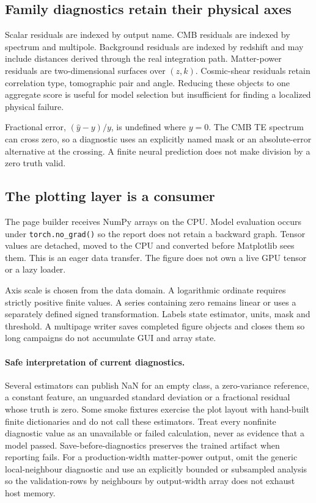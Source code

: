 \documentclass[10pt,aps,prd,twocolumn,nofootinbib]{revtex4-2}
\newcommand{\code}[1]{\texttt{#1}}
\begin{document}
\subsection{Family diagnostics retain their physical axes}

Scalar residuals are indexed by output name.  CMB residuals are indexed by
spectrum and multipole.  Background residuals are indexed by redshift and may
include distances derived through the real integration path.  Matter-power
residuals are two-dimensional surfaces over \((z,k)\).  Cosmic-shear residuals
retain correlation type, tomographic pair and angle.  Reducing these objects
to one aggregate score is useful for model selection but insufficient for
finding a localized physical failure.

Fractional error, \((\widehat y-y)/y\), is undefined where \(y=0\).  The CMB
TE spectrum can cross zero, so a diagnostic uses an explicitly named mask or
an absolute-error alternative at the crossing.  A finite neural prediction
does not make division by a zero truth valid.

\subsection{The plotting layer is a consumer}

The page builder receives NumPy arrays on the CPU.  Model evaluation occurs
under \code{torch.no\_grad()} so the report does not retain a backward graph.
Tensor values are detached, moved to the CPU and converted before Matplotlib
sees them.  This is an eager data transfer.  The figure does not own a live GPU
tensor or a lazy loader.

Axis scale is chosen from the data domain.  A logarithmic ordinate requires
strictly positive finite values.  A series containing zero remains linear or
uses a separately defined signed transformation.  Labels state estimator,
units, mask and threshold.  A multipage writer saves completed figure objects
and closes them so long campaigns do not accumulate GUI and array state.

\paragraph{Safe interpretation of current diagnostics.}
Several estimators can publish NaN for an empty class, a zero-variance
reference, a constant feature, an unguarded standard deviation or a
fractional residual whose truth is zero.  Some smoke fixtures exercise the
plot layout with hand-built finite dictionaries and do not call these
estimators.  Treat every nonfinite diagnostic value as an unavailable or failed
calculation, never as evidence that a model passed.  Save-before-diagnostics
preserves the trained artifact when reporting fails.  For a production-width
matter-power output, omit the generic local-neighbour diagnostic and use an
explicitly bounded or subsampled analysis so the validation-rows by neighbours
by output-width array does not exhaust host memory.
\end{document}
